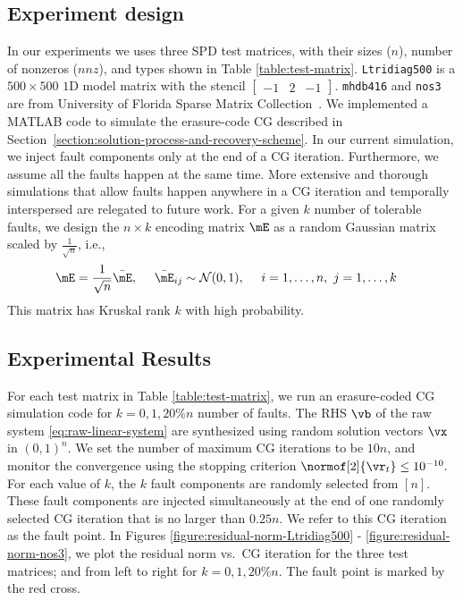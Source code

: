 \documentclass[11pt]{article}
\begin{document}
\subsection{Experiment design}

In our experiments we uses three SPD test matrices, with their sizes ($n$), number of nonzeros ($nnz$), and types shown in Table \ref{table:test-matrix}. {\tt Ltridiag500} is a $500\times 500$ $1$D model matrix with the stencil $\left[\begin{array}{lll}
-1 & 2 & -1
\end{array}\right]$. {\tt mhdb416} and {\tt nos3} are from University of Florida Sparse Matrix Collection~\cite{DavisH:2011}.
We implemented a MATLAB code to simulate the erasure-code CG described in Section~\ref{section:solution-process-and-recovery-scheme}. In our current simulation, we inject fault components only at the end of a CG iteration. Furthermore, we assume all the faults happen at the same time. More extensive and thorough simulations that allow faults happen anywhere in a CG iteration and temporally interspersed are relegated to future work. For a given $k$ number of tolerable faults, we design the $n\times k$ encoding matrix $\mE$ as a random Gaussian matrix scaled by $\frac{1}{\sqrt{n}}$, i.e.,
\begin{align*}
\mE&=\frac{1}{\sqrt{n}}\bar{\mE}, \ \ \ \ \bar{\mE}_{ij} \sim \mathcal{N}(0,1), \ \ \ \ i=1,\ldots,n,\ j=1,\ldots,k
\end{align*}
This matrix has Kruskal rank $k$ with high probability.


\subsection{Experimental Results}

For each test matrix in Table \ref{table:test-matrix}, we run an erasure-coded CG simulation code for $k=0,1,20\%n$ number of faults. The RHS $\vb$ of the raw system \eqref{eq:raw-linear-system} are synthesized using random solution vectors $\vx$ in $(0,1)^n$. We set the number of maximum CG iterations to be $10n$, and monitor the convergence using the stopping criterion $\normof[2]{ \vr_t } \leq 10^{-10}.$ For each value of $k$, the $k$ fault components are randomly selected from $[n]$. These fault components are injected simultaneously at the end of one randomly selected CG iteration that is no larger than $0.25n$. We refer to this CG iteration as the fault point. In Figures \ref{figure:residual-norm-Ltridiag500} - \ref{figure:residual-norm-nos3}, we plot the residual norm vs.~CG iteration for the three test matrices; and from left to right for $k=0,1,20\%n$. The fault point is marked by the red cross.
\end{document}
